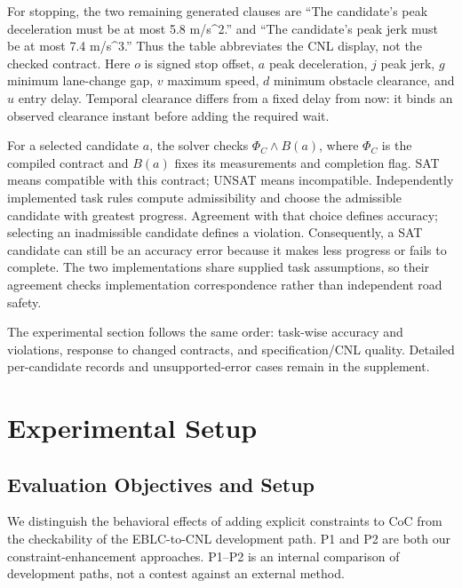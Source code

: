 \documentclass[nolineno]{ieeeaccess}
\begin{document}
For stopping, the two remaining generated clauses are “The candidate's peak deceleration must be at most 5.8 m/s\textasciicircum{}2.” and “The candidate's peak jerk must be at most 7.4 m/s\textasciicircum{}3.” Thus the table abbreviates the CNL display, not the checked contract. Here $o$ is signed stop offset, $a$ peak deceleration, $j$ peak jerk, $g$ minimum lane-change gap, $v$ maximum speed, $d$ minimum obstacle clearance, and $u$ entry delay. Temporal clearance differs from a fixed delay from now: it binds an observed clearance instant before adding the required wait.\par

For a selected candidate $a$, the solver checks $\Phi_C\land B(a)$, where $\Phi_C$ is the compiled contract and $B(a)$ fixes its measurements and completion flag. SAT means compatible with this contract; UNSAT means incompatible. Independently implemented task rules compute admissibility and choose the admissible candidate with greatest progress. Agreement with that choice defines accuracy; selecting an inadmissible candidate defines a violation. Consequently, a SAT candidate can still be an accuracy error because it makes less progress or fails to complete. The two implementations share supplied task assumptions, so their agreement checks implementation correspondence rather than independent road safety.\par

The experimental section follows the same order: task-wise accuracy and violations, response to changed contracts, and specification/CNL quality. Detailed per-candidate records and unsupported-error cases remain in the supplement.\par
\section{Experimental Setup}

\subsection{Evaluation Objectives and Setup}

We distinguish the behavioral effects of adding explicit constraints to CoC from the checkability of the EBLC-to-CNL development path. P1 and P2 are both our constraint-enhancement approaches. P1--P2 is an internal comparison of development paths, not a contest against an external method.\par
\end{document}
